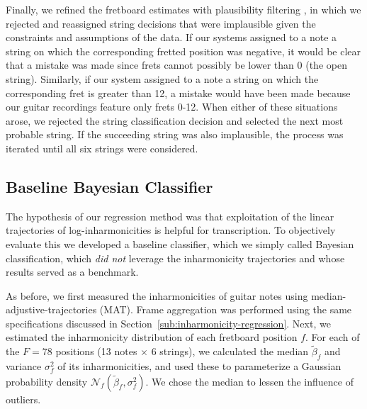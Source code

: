 \documentclass[convention,peer-reviewed]{aesconf}
\begin{document}
Finally, we refined the fretboard estimates with plausibility filtering \citep{abesser2012}, in which we rejected and reassigned string decisions that were implausible given the constraints and assumptions of the data. If our systems assigned to a note a string on which the corresponding fretted position was negative, it would be clear that a mistake was made since frets cannot possibly be lower than 0 (the open string). Similarly, if our system assigned to a note a string on which the corresponding fret is greater than 12, a mistake would have been made because our guitar recordings feature only frets 0-12. When either of these situations arose, we rejected the string classification decision and selected the next most probable string. If the succeeding string was also implausible, the process was iterated until all six strings were considered.

\subsection{Baseline Bayesian Classifier}
The hypothesis of our regression method was that exploitation of the linear trajectories of log-inharmonicities is helpful for transcription. To objectively evaluate this we developed a baseline classifier, which we simply called Bayesian classification, which \textit{did not} leverage                    the inharmonicity trajectories and whose results served as a benchmark.

As before, we first measured the inharmonicities of guitar notes using median-adjustive-trajectories (MAT). Frame aggregation was performed using the same specifications discussed in Section~\ref{sub:inharmonicity-regression}. Next, we estimated the inharmonicity distribution of each fretboard position $f$. For each of the $F=78$ positions (13 notes $\times$ 6 strings), we calculated the median $\tilde{\beta}_f$ and variance $\sigma^2_f$ of its inharmonicities, and used these to parameterize a Gaussian probability density $\mathcal{N}_f(\tilde{\beta}_f,\sigma^2_f)$. We chose the median to lessen the influence of outliers.
\end{document}
